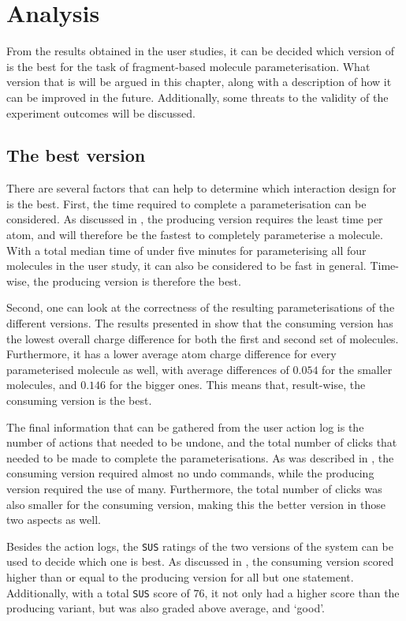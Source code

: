 \chapter{Analysis}

From the results obtained in the user studies, it can be decided which version of \oframp{} is the best for the task of fragment-based molecule parameterisation. What version that is will be argued in this chapter, along with a description of how it can be improved in the future. Additionally, some threats to the validity of the experiment outcomes will be discussed.


\section{The best version}
There are several factors that can help to determine which interaction design for \oframp{} is the best. First, the time required to complete a parameterisation can be considered. As discussed in , the producing version requires the least time per atom, and will therefore be the fastest to completely parameterise a molecule. With a total median time of under five minutes for parameterising all four molecules in the user study, it can also be considered to be fast in general. Time-wise, the producing version is therefore the best.

Second, one can look at the correctness of the resulting parameterisations of the different versions. The results presented in  show that the consuming version has the lowest overall charge difference for both the first and second set of molecules. Furthermore, it has a lower average atom charge difference for every parameterised molecule as well, with average differences of $0.054$ for the smaller molecules, and $0.146$ for the bigger ones. This means that, result-wise, the consuming version is the best.

The final information that can be gathered from the user action log is the number of actions that needed to be undone, and the total number of clicks that needed to be made to complete the parameterisations. As was described in , the consuming version required almost no undo commands, while the producing version required the use of many. Furthermore, the total number of clicks was also smaller for the consuming version, making this the better version in those two aspects as well.

Besides the action logs, the \verb|SUS| ratings of the two versions of the system can be used to decide which one is best. As discussed in , the consuming version scored higher than or equal to the producing version for all but one statement. Additionally, with a total \verb|SUS| score of $76$, it not only had a higher score than the producing variant, but was also graded above average, and `good'.


